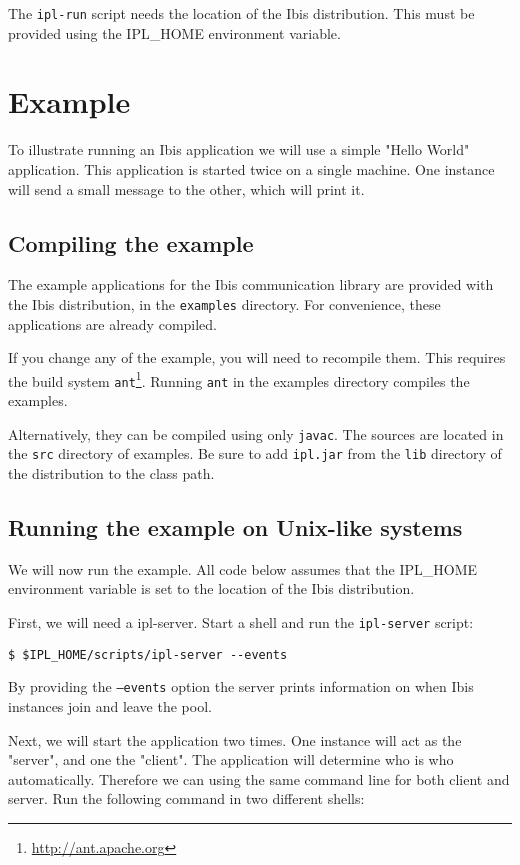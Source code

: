 \documentclass[a4paper,10pt]{article}
\begin{document}
The \texttt{ipl-run} script needs the location of the Ibis
distribution. This must be provided using the IPL\_HOME environment
variable.

\section{Example}

To illustrate running an Ibis application we will use a simple "Hello
World" application. This application is started twice on a single
machine. One instance will send a small message to the other, which will
print it.

\subsection{Compiling the example}

The example applications for the Ibis communication library are
provided with the Ibis distribution, in the \texttt{examples} directory.
For convenience, these applications are already compiled. 

If you change any of the example, you will need to recompile them. This 
requires the build system \texttt{ant}\footnote{\url{http://ant.apache.org}}. 
Running \texttt{ant} in the examples directory compiles the examples.

Alternatively, they can be compiled using only \texttt{javac}. The sources are
located in the \texttt{src} directory of examples. Be sure to add
\texttt{ipl.jar} 
from the \texttt{lib} directory of the distribution to the class path.

\subsection{Running the example on Unix-like systems}

We will now run the example. All code below assumes that the IPL\_HOME
environment variable is set to the location of the Ibis distribution.

First, we will need a ipl-server. Start a shell and
run the \texttt{ipl-server} script:
\noindent
{\small
\begin{verbatim}
$ $IPL_HOME/scripts/ipl-server --events
\end{verbatim}
}
\noindent

By providing the \texttt{--events} option the server 
prints information on when Ibis instances join and leave the pool.

Next, we will start the application two times. One instance will act as the
"server", and one the "client". The application will determine who is who
automatically. Therefore we can using the same command line for both client 
and server. Run the following command in two different shells:
\end{document}
